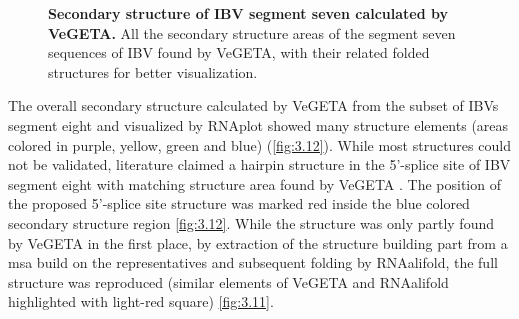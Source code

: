     \begin{figure}[!htb]
        \centering
        \caption[Secondary structure calculated by VeGETA]{\textbf{Secondary structure of \gls{IBV} segment seven calculated by VeGETA.} All the secondary structure areas of the segment seven sequences of \gls{IBV} found by VeGETA, with their related folded structures for better visualization.}
        \label{fig:3.13}
    \end{figure}
    
    The overall secondary structure calculated by VeGETA from the subset of \glspl{IBV} segment eight and visualized by RNAplot showed many structure elements (areas colored in purple, yellow, green and blue) (\autoref{fig:3.12}). While most structures could not be validated,
    literature claimed a hairpin structure in the 5'-splice site of \gls{IBV} segment eight with matching structure area found by VeGETA \autocite{structure_BC}. The position of the proposed 5'-splice site structure was marked red inside the blue colored secondary structure region \autoref{fig:3.12}. 
    While the structure was only partly found by VeGETA in the first place, by extraction of the structure building part from a \gls{msa} build on the representatives and subsequent folding by RNAalifold, the full structure was reproduced (similar elements of VeGETA and RNAalifold highlighted with light-red square) \autoref{fig:3.11}. 
    
